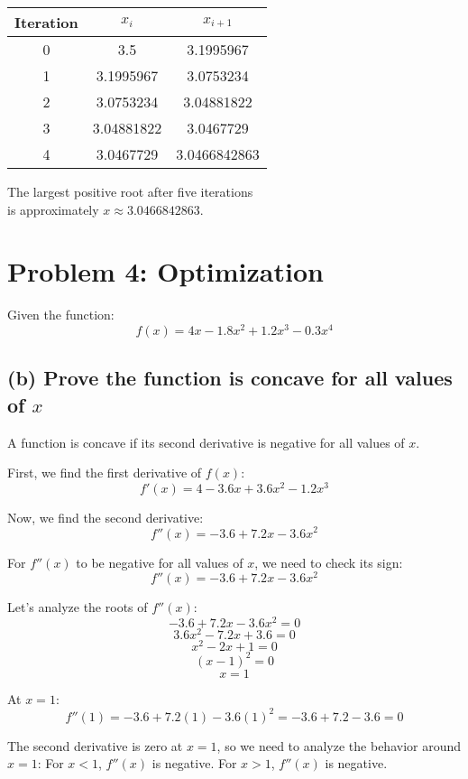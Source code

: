 \documentclass[12pt]{article}
\begin{document}
\begin{center}
    \begin{tabular}{||c c c||} 
     \hline
     Iteration & $x_i$ & $x_{i+1}$ \\ [0.5ex] 
     \hline\hline
     0 & 3.5 & 3.1995967\\ 
     \hline
     1 & 3.1995967 & 3.0753234  \\
     \hline
     2 & 3.0753234 & 3.04881822 \\
     \hline
     3 & 3.04881822 & 3.0467729 \\
     \hline
     4 & 3.0467729 & 3.0466842863 \\
     \hline
    \end{tabular}
\end{center}

The largest positive root after five iterations \\
is approximately \(x \approx 3.0466842863\).

\section*{Problem 4: Optimization}

Given the function:
\[
f(x) = 4x - 1.8x^2 + 1.2x^3 - 0.3x^4
\]

\subsection*{(b) Prove the function is concave for all values of \(x\)}

A function is concave if its second derivative is negative for all values of \(x\).

First, we find the first derivative of \(f(x)\):
\[
f'(x) = 4 - 3.6x + 3.6x^2 - 1.2x^3
\]

Now, we find the second derivative:
\[
f''(x) = -3.6 + 7.2x - 3.6x^2
\]

For \(f''(x)\) to be negative for all values of \(x\), we need to check its sign:
\[
f''(x) = -3.6 + 7.2x - 3.6x^2
\]

Let's analyze the roots of \(f''(x)\):
\[
-3.6 + 7.2x - 3.6x^2 = 0
\]
\[
3.6x^2 - 7.2x + 3.6 = 0
\]
\[
x^2 - 2x + 1 = 0
\]
\[
(x - 1)^2 = 0
\]
\[
x = 1
\]

At \(x = 1\):
\[
f''(1) = -3.6 + 7.2(1) - 3.6(1)^2 = -3.6 + 7.2 - 3.6 = 0
\]

The second derivative is zero at \(x = 1\), so we need to analyze the behavior around \(x = 1\):
For \(x < 1\), \(f''(x)\) is negative.
For \(x > 1\), \(f''(x)\) is negative.
\end{document}
